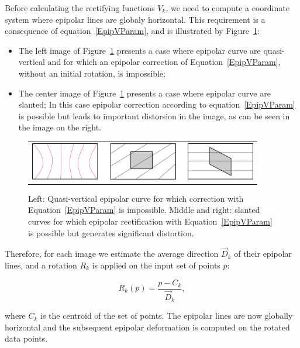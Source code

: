 \documentclass{ipol}
\begin{document}
\label{EstCenterDir}

Before calculating the rectifying functions $V_k$, we need to compute a coordinate system where epipolar lines are globaly horizontal. This requirement is
a consequence of equation~\eqref{EpipVParam}, and is illustrated by Figure~\ref{ReqOrient}:


\begin{itemize}
   \item The left image of Figure~\ref{ReqOrient} presents a case where epipolar curve are quasi-vertical
         and for which an epipolar correction of Equation~\eqref{EpipVParam}, without an initial rotation,  is impossible;
   \item The center image of Figure~\ref{ReqOrient} presents a case where epipolar curve are slanted;
         In this case epipolar correction according to equation~\eqref{EpipVParam} is possible
         but leads to important distorsion in the image, as can be seen in the image on the right.
\end{itemize}

\begin{figure}
\centering
\begin{tabular}{c}
\includegraphics[width=10cm]{FIGS/EpipReqOrient.png}
\end{tabular}
\caption{Left: Quasi-vertical epipolar curve for which correction with Equation~\eqref{EpipVParam} is impossible.  Middle and right: slanted curves for which epipolar rectification  with Equation~\eqref{EpipVParam} is possible
         but generates significant distortion.}
\label{ReqOrient}
\end{figure}

Therefore, for each image we estimate the average direction $\vec{D}_k$
of their epipolar lines, and a rotation $R_k$ is applied on the  input set of points $p$:

\begin{equation}
    R_k(p) =  \frac{p-C_k}{\vec{D}_k},  \label{EqRot}
\end{equation}

where $C_k$ is the centroid of the set of points. The epipolar lines are now globally horizontal and the subsequent epipolar deformation is computed on the rotated data points. 
\end{document}
